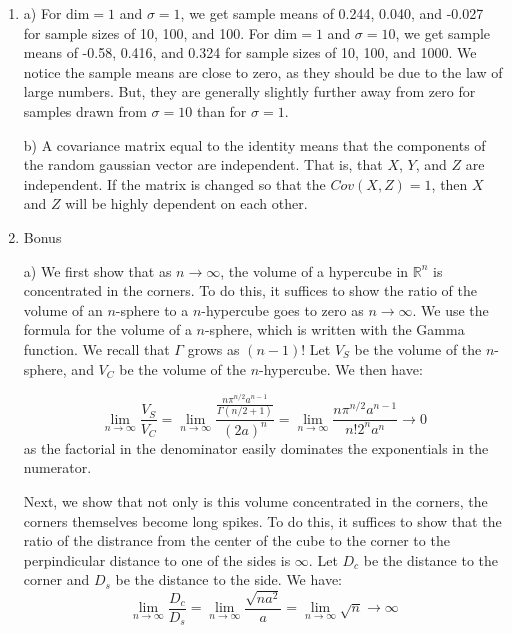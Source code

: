 \documentclass[12pt]{article}
\theoremstyle{plain}
\theoremstyle{definition}
\begin{document}
\begin{enumerate}
\vspace{1pc}


\item
a) 
For dim$=1$ and $\sigma =1$, we get sample means of 0.244, 0.040, and -0.027 for sample sizes of 10, 100, and 100. For dim$=1$ and $\sigma=10$, we get sample means of -0.58, 0.416, and 0.324  for sample sizes of 10, 100, and 1000. We notice the sample means are close to zero, as they should be due to the law of large numbers. But, they are generally slightly further away from zero for samples drawn from $\sigma=10$ than for $\sigma=1$. 

b) A covariance matrix equal to the identity means that the components of the random gaussian vector are independent. That is, that $X$, $Y$, and $Z$ are independent. If the matrix is changed so that the $Cov(X,Z) = 1$, then $X$ and $Z$ will be highly dependent on each other. 


\vspace{1pc}

\item
Bonus

a) We first show that as $n \rightarrow \infty$, the volume of a hypercube in $\mathbb{R}^n$ is concentrated in the corners. To do this, it suffices to show the ratio of the volume of an $n$-sphere to a $n$-hypercube goes to zero as $n \rightarrow \infty$. We use the formula for the volume of a $n$-sphere, which is written with the Gamma function. We recall that $\Gamma$ grows as $(n-1)!$ Let $V_S$ be the volume of the $n$-sphere, and $V_C$ be the volume of the $n$-hypercube. We then have:

$$ \lim_{n \rightarrow \infty} \frac{V_S}{V_C} = 
\lim_{n \rightarrow \infty} \frac{ \frac{n \pi^{n/2} a^{n-1}}{\Gamma(n/2 +1)}}{(2a)^n}
= \lim_{n \rightarrow \infty} \frac{n \pi^{n/2} a^{n-1}}{n! 2^n a^n} \rightarrow 0 $$
as the factorial in the denominator easily dominates the exponentials in the numerator. 

Next, we show that not only is this volume concentrated in the corners, the corners themselves become long spikes. To do this, it suffices to show that the ratio of the distrance from the center of the cube to the corner to the perpindicular distance to one of the sides is $\infty$. Let $D_c$ be the distance to the corner and $D_s$ be the distance to the side. We have:
$$ \lim_{n \rightarrow \infty} \frac{D_c}{D_s} = \lim_{n \rightarrow \infty} \frac{\sqrt{na^2}}{a} = \lim_{n \rightarrow \infty} \sqrt{n} \rightarrow \infty $$



\end{enumerate}
\end{document}

